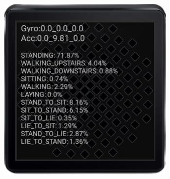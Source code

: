 \documentclass[landscape,a3,final,24pt]{issposter}
\begin{document}
\begin{multicols}{3}
\begin{figure}
\centering
\includegraphics[scale=0.5]{Pictures/Android_example.png}
\end{figure}

\end{multicols}
\end{document}
